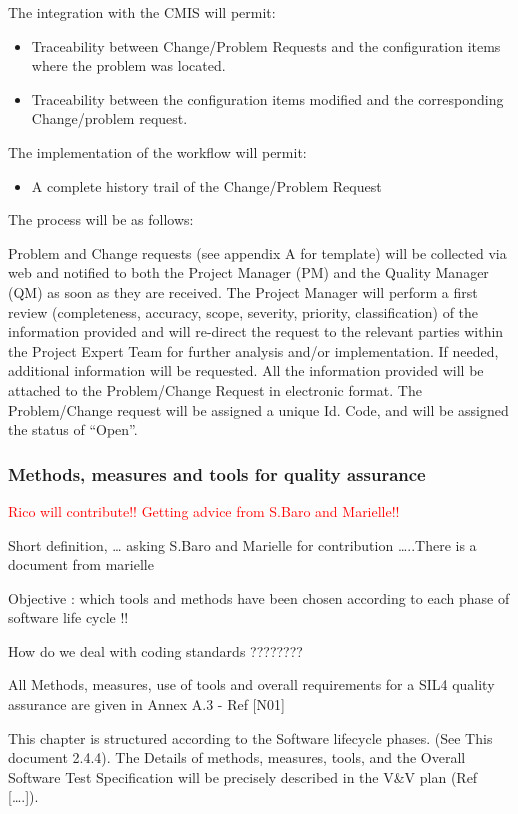 \documentclass{template/openetcs_article}
\begin{document}
The integration with the CMIS will permit:
\begin{itemize}
\item Traceability between Change/Problem Requests and the configuration items where the problem was located.
\item Traceability between the configuration items modified and the corresponding Change/problem request. 
\end{itemize}
The implementation of the workflow will permit:
\begin{itemize}
\item A complete history trail of the Change/Problem Request
\end{itemize}

The process will be as follows:

Problem and Change requests (see appendix A for template) will be collected via web and notified to both the Project Manager (PM) and the Quality Manager (QM) as soon as they are received. The Project Manager will perform a first review (completeness, accuracy, scope, severity, priority, classification) of the information provided and will re-direct the request to the relevant parties within the Project Expert Team for further analysis and/or implementation. If needed, additional information will be requested. All the information provided will be attached to the Problem/Change Request in electronic format. The Problem/Change request will be assigned a unique Id. Code, and will be assigned the status of ``Open''.


\subsubsection{Methods, measures and tools for quality assurance}
\textcolor{red}{Rico will contribute!! Getting advice from S.Baro and Marielle!!}

Short definition, {\dots} asking S.Baro and Marielle for contribution {\dots}..There is a document from marielle 

Objective : which tools and methods have been chosen according to each phase of software life cycle !!

How do we deal with coding standards ????????

All Methods, measures, use of tools and overall requirements for a SIL4 quality assurance are given in Annex A.3 - Ref [N01]

This chapter is structured according to the Software lifecycle phases. (See This document 2.4.4). The Details of methods, measures, tools, and the Overall Software Test Specification will be precisely described in the V\&V plan (Ref [{\dots}.]).
\end{document}
